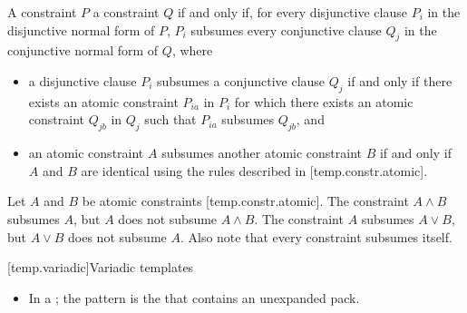 \documentclass{wg21}
\begin{document}
\pnum
A constraint $P$  a constraint $Q$
if and only if,
for every disjunctive clause $P_i$
in the disjunctive normal form
of $P$, $P_i$ subsumes every conjunctive clause $Q_j$
in the conjunctive normal form of $Q$, where
\begin{itemize}
    \item
    a disjunctive clause $P_i$ subsumes a conjunctive clause $Q_j$ if and only
    if there exists an atomic constraint $P_{ia}$ in $P_i$ for which there exists
    an atomic constraint $Q_{jb}$ in $Q_j$ such that $P_{ia}$ subsumes $Q_{jb}$, and

    \item an atomic constraint $A$ subsumes another atomic constraint
    $B$ if and only if $A$ and $B$ are identical using the
    rules described in [temp.constr.atomic].

\end{itemize}
%
%

\begin{example}
    Let $A$ and $B$ be atomic constraints [temp.constr.atomic].
    The constraint $A \land B$ subsumes $A$, but $A$ does not subsume $A \land B$.
    The constraint $A$ subsumes $A \lor B$, but $A \lor B$ does not subsume $A$.
    Also note that every constraint subsumes itself.
\end{example}



[temp.variadic]{Variadic templates}

\begin{itemize}
	\item In a ;
	the pattern is the 
	that contains an unexpanded pack.


\end{itemize}
\end{document}
